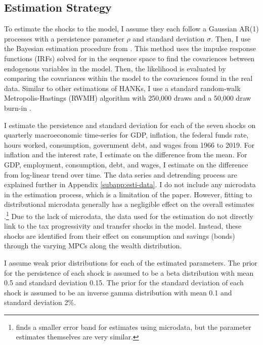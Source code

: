 \subsection{Estimation Strategy}

To estimate the shocks to the model, I assume they each follow a Gaussian AR(1) processes with a persistence parameter $\rho$ and standard deviation $\sigma$. Then, I use the Bayesian estimation procedure from \textcite{auclert2021using}. This method uses the impulse response functions (IRFs) solved for in the sequence space to find the covariences between endogenous variables in the model. Then, the likelihood is evaluated by comparing the covariances within the model to the covariences found in the real data. Similar to other estimations of HANKs, I use a standard random-walk Metropolis-Hastings (RWMH) algorithm with 250,000 draws and a 50,000 draw burn-in \autocites{auclert2021using}{bayer2024shocks}.

I estimate the persistence and standard deviation for each of the seven shocks on quarterly macroeconomic time-series for GDP, inflation, the federal funds rate, hours worked, consumption, government debt, and wages from 1966 to 2019. For inflation and the interest rate, I estimate on the difference from the mean. For GDP, employment, consumption, debt, and wages, I estimate on the difference from log-linear trend over time. The data series and detrending process are explained further in Appendix \ref{subapp:esti-data}. I do not include any microdata in the estimation process, which is a limitation of the paper. However, fitting to distributional microdata generally has a negligible effect on the overall estimates \autocite{bayer2024shocks}.\footnote{\textcite{iao2024estimating} finds a smaller error band for estimates using microdata, but the parameter estimates themselves are very similar.} Due to the lack of microdata, the data used for the estimation do not directly link to the tax progressivity and transfer shocks in the model. Instead, these shocks are identified from their effect on consumption and savings (bonds) through the varying MPCs along the wealth distribution.

I assume weak prior distributions for each of the estimated parameters. The prior for the persistence of each shock is assumed to be a beta distribution with mean 0.5 and standard deviation 0.15. The prior for the standard deviation of each shock is assumed to be an inverse gamma distribution with mean 0.1 and standard deviation 2\%.


